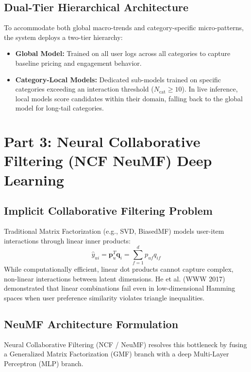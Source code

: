 \documentclass[11pt,a4paper]{article}
\begin{document}
\subsection{Dual-Tier Hierarchical Architecture}
To accommodate both global macro-trends and category-specific micro-patterns, the system deploys a two-tier hierarchy:
\begin{itemize}
    \item \textbf{Global Model:} Trained on all user logs across all categories to capture baseline pricing and engagement behavior.
    \item \textbf{Category-Local Models:} Dedicated sub-models trained on specific categories exceeding an interaction threshold ($N_{\text{cat}} \ge 10$). In live inference, local models score candidates within their domain, falling back to the global model for long-tail categories.
\end{itemize}

\newpage
\section{Part 3: Neural Collaborative Filtering (NCF NeuMF) Deep Learning}

\subsection{Implicit Collaborative Filtering Problem}
Traditional Matrix Factorization (e.g., SVD, BiasedMF) models user-item interactions through linear inner products:
\begin{equation}
    \hat{y}_{ui} = \mathbf{p}_u^T \mathbf{q}_i = \sum_{f=1}^d p_{uf} q_{if}
\end{equation}
While computationally efficient, linear dot products cannot capture complex, non-linear interactions between latent dimensions. He et al. (WWW 2017) demonstrated that linear combinations fail even in low-dimensional Hamming spaces when user preference similarity violates triangle inequalities.

\subsection{NeuMF Architecture Formulation}
Neural Collaborative Filtering (NCF / NeuMF) resolves this bottleneck by fusing a Generalized Matrix Factorization (GMF) branch with a deep Multi-Layer Perceptron (MLP) branch.
\end{document}
